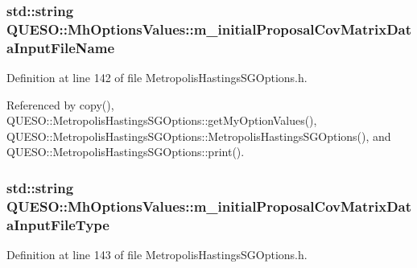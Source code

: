 \hypertarget{class_q_u_e_s_o_1_1_mh_options_values_af4cc4b8f1cea9441c9243d3ada49796b}{
\subsubsection[{m\-\_\-initial\-Proposal\-Cov\-Matrix\-Data\-Input\-File\-Name}]{\setlength{\rightskip}{0pt plus 5cm}std\-::string Q\-U\-E\-S\-O\-::\-Mh\-Options\-Values\-::m\-\_\-initial\-Proposal\-Cov\-Matrix\-Data\-Input\-File\-Name}}\label{class_q_u_e_s_o_1_1_mh_options_values_af4cc4b8f1cea9441c9243d3ada49796b}


Definition at line 142 of file Metropolis\-Hastings\-S\-G\-Options.\-h.



Referenced by copy(), Q\-U\-E\-S\-O\-::\-Metropolis\-Hastings\-S\-G\-Options\-::get\-My\-Option\-Values(), Q\-U\-E\-S\-O\-::\-Metropolis\-Hastings\-S\-G\-Options\-::\-Metropolis\-Hastings\-S\-G\-Options(), and Q\-U\-E\-S\-O\-::\-Metropolis\-Hastings\-S\-G\-Options\-::print().

\hypertarget{class_q_u_e_s_o_1_1_mh_options_values_afd25d3ec572922fe1cf7ff39d431633e}{
\subsubsection[{m\-\_\-initial\-Proposal\-Cov\-Matrix\-Data\-Input\-File\-Type}]{\setlength{\rightskip}{0pt plus 5cm}std\-::string Q\-U\-E\-S\-O\-::\-Mh\-Options\-Values\-::m\-\_\-initial\-Proposal\-Cov\-Matrix\-Data\-Input\-File\-Type}}\label{class_q_u_e_s_o_1_1_mh_options_values_afd25d3ec572922fe1cf7ff39d431633e}


Definition at line 143 of file Metropolis\-Hastings\-S\-G\-Options.\-h.



